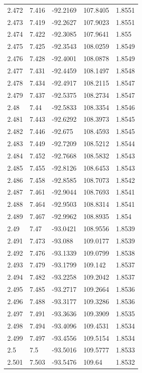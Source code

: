 \begin{tabular}{lllll}
2.472 & 7.416 & -92.2169 & 107.8405 & 1.8551 \\
2.473 & 7.419 & -92.2627 & 107.9023 & 1.8551 \\
2.474 & 7.422 & -92.3085 & 107.9641 & 1.855 \\
2.475 & 7.425 & -92.3543 & 108.0259 & 1.8549 \\
2.476 & 7.428 & -92.4001 & 108.0878 & 1.8549 \\
2.477 & 7.431 & -92.4459 & 108.1497 & 1.8548 \\
2.478 & 7.434 & -92.4917 & 108.2115 & 1.8547 \\
2.479 & 7.437 & -92.5375 & 108.2734 & 1.8547 \\
2.48 & 7.44 & -92.5833 & 108.3354 & 1.8546 \\
2.481 & 7.443 & -92.6292 & 108.3973 & 1.8545 \\
2.482 & 7.446 & -92.675 & 108.4593 & 1.8545 \\
2.483 & 7.449 & -92.7209 & 108.5212 & 1.8544 \\
2.484 & 7.452 & -92.7668 & 108.5832 & 1.8543 \\
2.485 & 7.455 & -92.8126 & 108.6453 & 1.8543 \\
2.486 & 7.458 & -92.8585 & 108.7073 & 1.8542 \\
2.487 & 7.461 & -92.9044 & 108.7693 & 1.8541 \\
2.488 & 7.464 & -92.9503 & 108.8314 & 1.8541 \\
2.489 & 7.467 & -92.9962 & 108.8935 & 1.854 \\
2.49 & 7.47 & -93.0421 & 108.9556 & 1.8539 \\
2.491 & 7.473 & -93.088 & 109.0177 & 1.8539 \\
2.492 & 7.476 & -93.1339 & 109.0799 & 1.8538 \\
2.493 & 7.479 & -93.1799 & 109.142 & 1.8537 \\
2.494 & 7.482 & -93.2258 & 109.2042 & 1.8537 \\
2.495 & 7.485 & -93.2717 & 109.2664 & 1.8536 \\
2.496 & 7.488 & -93.3177 & 109.3286 & 1.8536 \\
2.497 & 7.491 & -93.3636 & 109.3909 & 1.8535 \\
2.498 & 7.494 & -93.4096 & 109.4531 & 1.8534 \\
2.499 & 7.497 & -93.4556 & 109.5154 & 1.8534 \\
2.5 & 7.5 & -93.5016 & 109.5777 & 1.8533 \\
2.501 & 7.503 & -93.5476 & 109.64 & 1.8532 \\

\end{tabular}
